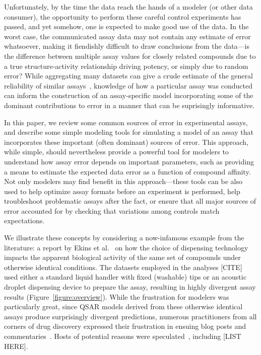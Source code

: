\documentclass[aps,pre,twocolumn,nofootinbib,superscriptaddress,linenumbers]{revtex4-1}
\begin{document}
Unfortunately, by the time the data reach the hands of a modeler (or other data consumer), the opportunity to perform these careful control experiments has passed, and yet somehow, one is expected to make good use of the data.
In the worst case, the communicated assay data may not contain any estimate of error whatsoever, making it fiendishly difficult to draw conclusions from the data---is the difference between multiple assay values for closely related compounds due to a true structure-activity relationship driving potency, or simply due to random error?
While aggregating many datasets can give a crude estimate of the general reliability of similar assays~\cite{kramer_experimental_2012,kalliokoski_comparability_2013}, knowledge of how a particular assay was conducted can inform the construction of an assay-specific model incorporating some of the dominant contributions to error in a manner that can be suprisingly informative.



In this paper, we review some common sources of error in experimental assays, and describe some simple modeling tools for simulating a model of an assay that incorporates these important (often dominant) sources of error. 
This approach, while simple, should nevertheless provide a powerful tool for modelers to understand how assay error depends on important parameters, such as providing a means to estimate the expected data error as a function of compound affinity.
Not only modelers may find benefit in this approach---these tools can be also used to help optimize assay formats before an experiment is performed, help troubleshoot problematic assays after the fact, or ensure that all major sources of error accounted for by checking that variations among controls match expectations.

We illustrate these concepts by considering a now-infamous example from the literature: a report by Ekins et al.~\cite{ekins_dispensing_2013} on how the choice of dispensing technology impacts the apparent biological activity of the same set of compounds under otherwise identical conditions.
The datasets employed in the analyses [CITE] used either a standard liquid handler with fixed (washable) tips or an acoustic droplet dispensing device to prepare the assay, resulting in highly divergent assay results (Figure~\ref{figure:overview}).
While the frustration for modelers was particularly great, since QSAR models derived from these otherwise identical assays produce surprisingly divergent predictions, numerous practitioners from all corners of drug discovery expressed their frustration in ensuing blog posts and commentaries~\cite{in-the-pipeline-comments}.
Hosts of potential reasons were speculated~\cite{in-the-pipeline-comments}, including [LIST HERE].
\end{document}
